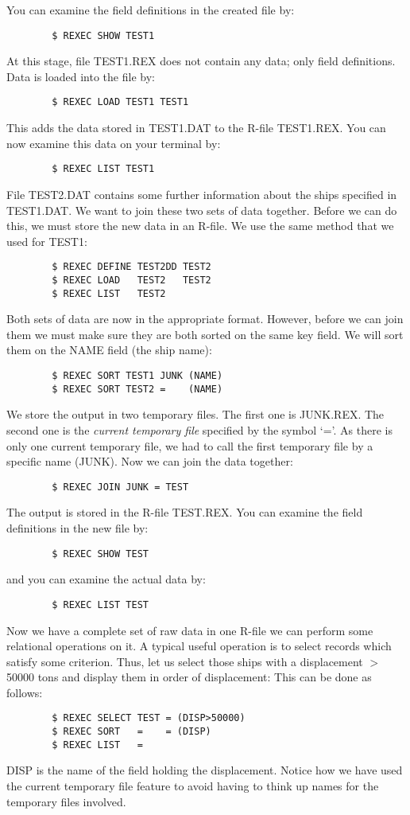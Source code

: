 You can examine the field definitions in the created file by:
\begin{verbatim}
        $ REXEC SHOW TEST1
\end{verbatim}
At this stage, file TEST1.REX does not contain any data; only field definitions.
Data is loaded into the file by:
\begin{verbatim}
        $ REXEC LOAD TEST1 TEST1
\end{verbatim}
This adds the data stored in TEST1.DAT to the R-file TEST1.REX.
You can now examine this data on your terminal by:
\begin{verbatim}
        $ REXEC LIST TEST1
\end{verbatim}
File TEST2.DAT contains some further information about the ships specified in
TEST1.DAT.
We want to join these two sets of data together.
Before we can do this, we must store the new data in an R-file.
We use the same method that we used for TEST1:
\begin{verbatim}
        $ REXEC DEFINE TEST2DD TEST2
        $ REXEC LOAD   TEST2   TEST2
        $ REXEC LIST   TEST2
\end{verbatim}
Both sets of data are now in the appropriate format.
However, before we can join them we must make sure they are both sorted on
the same key field.
We will sort them on the NAME field (the ship name):
\begin{verbatim}
        $ REXEC SORT TEST1 JUNK (NAME)
        $ REXEC SORT TEST2 =    (NAME)
\end{verbatim}
We store the output in two temporary files.
The first one is JUNK.REX.
The second one is the {\em current temporary file} specified by the symbol `='.
As there is only one current temporary file, we had to call the first temporary
file by a specific name (JUNK).
Now we can join the data together:
\begin{verbatim}
        $ REXEC JOIN JUNK = TEST
\end{verbatim}
The output is stored in the R-file TEST.REX.
You can examine the field definitions in the new file by:
\begin{verbatim}
        $ REXEC SHOW TEST
\end{verbatim}
and you can examine the actual data by:
\begin{verbatim}
        $ REXEC LIST TEST
\end{verbatim}
Now we have a complete set of raw data in one R-file we can perform some
relational operations on it.
A typical useful operation is to select records which satisfy some criterion.
Thus, let us select those ships with a displacement $>$50000 tons
and display them in order of displacement:
This can be done as follows:
\begin{verbatim}
        $ REXEC SELECT TEST = (DISP>50000)
        $ REXEC SORT   =    = (DISP)
        $ REXEC LIST   =
\end{verbatim}
DISP is the name of the field holding the displacement.
Notice how we have used the current temporary file feature to avoid having to
think up names for the temporary files involved.

